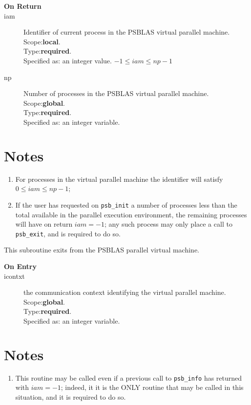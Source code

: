 \begin{description}
\item[\bf On Return]
\item[iam] Identifier of current  process in the PSBLAS virtual parallel machine.\\
Scope:{\bf local}.\\
Type:{\bf required}.\\
Specified as: an integer value. $-1 \le iam \le np-1$\
\item[np] Number of processes in the PSBLAS virtual parallel machine.\\
Scope:{\bf global}.\\
Type:{\bf required}.\\
Specified as: an integer variable. \
\end{description}


\section*{Notes}
\begin{enumerate}
\item For processes in the virtual parallel machine  the identifier
  will satisfy $0 \le iam \le np-1$;
\item If the user has requested on \verb|psb_init| a number of
  processes less than the total available in the parallel execution
  environment, the remaining processes will have on return $iam=-1$;
  any such process may  only place a call to \verb|psb_exit|, and is
  required to do so.
\end{enumerate}




This subroutine exits from the  PSBLAS parallel virtual  machine.
\begin{description}
\item[\bf  On Entry ]
\item[icontxt] the communication context identifying the virtual
  parallel machine.\\
Scope:{\bf global}.\\
Type:{\bf required}.\\
Specified as: an integer variable.
\end{description}

\section*{Notes}
\begin{enumerate}
\item This routine may be called even if a previous call to
  \verb|psb_info| has returned with $iam=-1$; indeed, it it is the ONLY
  routine that may be called in this situation, and it is required to
  do so.
\end{enumerate}

